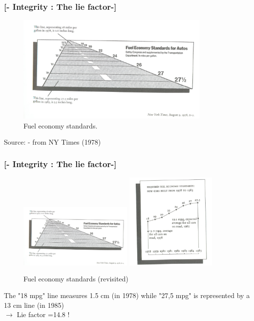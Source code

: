 \documentclass[xcolor=x11names,compress, aspectratio=169]{beamer}
\renewcommand{\(}{\begin{columns}}
\renewcommand{\)}{\end{columns}}
\newcommand{\<}[1]{\begin{column}{#1}}
\renewcommand{\>}{\end{column}}
\begin{document}
\begin{frame} %
\frametitle{\textcolor{brique}{[- Integrity : The lie factor-]}}
\begin{figure}[h]
\includegraphics[width = 0.85\textwidth]{FuelEconomy1.pdf}
\caption{Fuel economy standards.}
\end{figure}
 \textcolor{gris}{\footnotesize{Source:  \cite{Tufte2001}  - from NY Times (1978)}}
\end{frame}

\begin{frame}
\frametitle{\textcolor{brique}{[- Integrity : The lie factor-]}}
\begin{figure}[h]
\includegraphics[width = 0.5\textwidth]{FuelEconomy1.pdf}
\includegraphics[width = 0.4\textwidth, angle =-1]{FuelEconomy2.pdf}
\caption{Fuel economy standards (revisited)}
\end{figure}
The "18 mpg" line measures  1.5 cm (in 1978) while "27,5 mpg" is represented by a 13 cm line (in 1985) \\
$\longrightarrow$ Lie factor =14.8 !
\end{frame}
\end{document}
